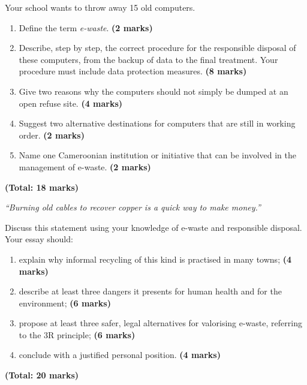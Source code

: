\documentclass[11pt]{article}
\begin{document}
\begin{exercice}
Your school wants to throw away 15 old computers.
\begin{enumerate}
\item Define the term \emph{e-waste}. \textbf{(2 marks)}
\item Describe, step by step, the correct procedure for the responsible disposal of these computers, from the backup of data to the final treatment. Your procedure must include data protection measures. \textbf{(8 marks)}
\item Give two reasons why the computers should not simply be dumped at an open refuse site. \textbf{(4 marks)}
\item Suggest two alternative destinations for computers that are still in working order. \textbf{(2 marks)}
\item Name one Cameroonian institution or initiative that can be involved in the management of e-waste. \textbf{(2 marks)}
\end{enumerate}
\hfill\textbf{(Total: 18 marks)}
\end{exercice}

\begin{exercice}
\emph{``Burning old cables to recover copper is a quick way to make money.''}

Discuss this statement using your knowledge of e-waste and responsible disposal. Your essay should:
\begin{enumerate}
\item explain why informal recycling of this kind is practised in many towns; \textbf{(4 marks)}
\item describe at least three dangers it presents for human health and for the environment; \textbf{(6 marks)}
\item propose at least three safer, legal alternatives for valorising e-waste, referring to the 3R principle; \textbf{(6 marks)}
\item conclude with a justified personal position. \textbf{(4 marks)}
\end{enumerate}
\hfill\textbf{(Total: 20 marks)}
\end{exercice}
\end{document}
